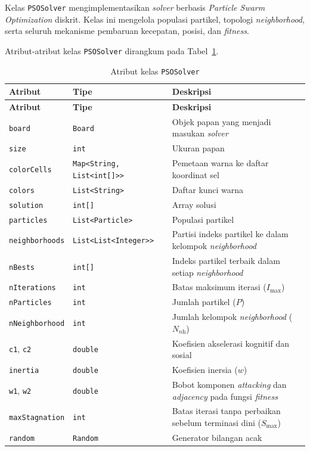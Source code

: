 Kelas \texttt{PSOSolver} mengimplementasikan \textit{solver} berbasis \textit{Particle Swarm Optimization} diskrit. Kelas ini mengelola populasi partikel, topologi \textit{neighborhood}, serta seluruh mekanisme pembaruan kecepatan, posisi, dan \textit{fitness}.

Atribut-atribut kelas \texttt{PSOSolver} dirangkum pada Tabel~\ref{tab:attr-pso}.

\begin{longtable}{llp{5.5cm}}
	\caption{Atribut kelas \texttt{PSOSolver}}
	\label{tab:attr-pso} \\
	\toprule
	\textbf{Atribut} & \textbf{Tipe} & \textbf{Deskripsi} \\
	\midrule
	\endfirsthead
	\toprule
	\textbf{Atribut} & \textbf{Tipe} & \textbf{Deskripsi} \\
	\midrule
	\endhead
	\bottomrule
	\endfoot
	\texttt{board} & \texttt{Board} & Objek papan yang menjadi masukan \textit{solver} \\
	\midrule
	\texttt{size} & \texttt{int} & Ukuran papan \\
	\midrule
	\texttt{colorCells} & \texttt{Map<String, List<int[]>{}>} & Pemetaan warna ke daftar koordinat sel \\
	\midrule
	\texttt{colors} & \texttt{List<String>} & Daftar kunci warna \\
	\midrule
	\texttt{solution} & \texttt{int[]} & Array solusi \\
	\midrule
	\texttt{particles} & \texttt{List<Particle>} & Populasi partikel \\
	\midrule
	\texttt{neighborhoods} & \texttt{List<List<Integer>{}>} & Partisi indeks partikel ke dalam kelompok \textit{neighborhood} \\
	\midrule
	\texttt{nBests} & \texttt{int[]} & Indeks partikel terbaik dalam setiap \textit{neighborhood} \\
	\midrule
	\texttt{nIterations} & \texttt{int} & Batas maksimum iterasi ($I_{\max}$) \\
	\midrule
	\texttt{nParticles} & \texttt{int} & Jumlah partikel ($P$) \\
	\midrule
	\texttt{nNeighborhood} & \texttt{int} & Jumlah kelompok \textit{neighborhood} ($N_{\textit{nh}}$) \\
	\midrule
	\texttt{c1}, \texttt{c2} & \texttt{double} & Koefisien akselerasi kognitif dan sosial \\
	\midrule
	\texttt{inertia} & \texttt{double} & Koefisien inersia ($w$) \\
	\midrule
	\texttt{w1}, \texttt{w2} & \texttt{double} & Bobot komponen \textit{attacking} dan \textit{adjacency} pada fungsi \textit{fitness} \\
	\midrule
	\texttt{maxStagnation} & \texttt{int} & Batas iterasi tanpa perbaikan sebelum terminasi dini ($S_{\max}$) \\
	\midrule
	\texttt{random} & \texttt{Random} & Generator bilangan acak \\
	\bottomrule
\end{longtable}

